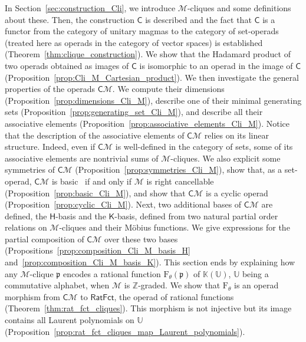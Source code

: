 \documentclass[10pt,reqno]{amsart}
\numberwithin{equation}{subsection}
\newcommand{\Z}{\mathbb{Z}}
\newcommand{\K}{\mathbb{K}}
\newcommand{\Mca}{\mathcal{M}}
\newcommand{\Hsf}{\mathsf{H}}
\newcommand{\Ksf}{\mathsf{K}}
\newcommand{\Ubb}{\mathbb{U}}
\newcommand{\Pfr}{\mathfrak{p}}
\newcommand{\Cli}{\mathsf{C}}
\newcommand{\RatFct}{\mathsf{RatFct}}
\newcommand{\Frac}{\mathrm{F}}
\begin{document}
In Section~\ref{sec:construction_Cli}, we introduce $\Mca$-cliques and
some definitions about these. Then, the construction $\Cli$ is
described and the fact that $\Cli$ is a functor from the category of
unitary magmas to the category of set-operads (treated here as operads
in the category of vector spaces) is established
(Theorem~\ref{thm:clique_construction}). We show that the Hadamard
product of two operads obtained as images of $\Cli$ is isomorphic to an
operad in the image of $\Cli$
(Proposition~\ref{prop:Cli_M_Cartesian_product}). We then investigate
the general properties of the operads $\Cli\Mca$. We compute their
dimensions (Proposition~\ref{prop:dimensions_Cli_M}), describe one of
their minimal generating sets
(Proposition~\ref{prop:generating_set_Cli_M}), and describe all their
associative elements (Proposition~\ref{prop:associative_elements_Cli_M}).
Notice that the description of the associative elements of $\Cli\Mca$
relies on its linear structure. Indeed, even if $\Cli\Mca$ is
well-defined in the category of sets, some of its associative elements
are nontrivial sums of $\Mca$-cliques. We also explicit some symmetries
of $\Cli\Mca$ (Proposition~\ref{prop:symmetries_Cli_M}), show that, as a
set-operad, $\Cli\Mca$ is basic~\cite{Val07} if and only if $\Mca$ is
right cancellable (Proposition~\ref{prop:basic_Cli_M}), and show that
$\Cli\Mca$ is a cyclic operad~\cite{GK95}
(Proposition~\ref{prop:cyclic_Cli_M}). Next, two additional bases of
$\Cli\Mca$ are defined, the $\Hsf$-basis and the $\Ksf$-basis, defined
from two natural partial order relations on $\Mca$-cliques and their
Möbius functions. We give expressions for the partial composition of
$\Cli\Mca$ over these two bases
(Propositions~\ref{prop:composition_Cli_M_basis_H}
and~\ref{prop:composition_Cli_M_basis_K}). This section ends by
explaining how any $\Mca$-clique $\Pfr$ encodes a rational function
$\Frac_\theta(\Pfr)$ of $\K(\Ubb)$, $\Ubb$ being a commutative alphabet,
when $\Mca$ is $\Z$-graded. We show that $\Frac_\theta$ is an operad
morphism from $\Cli\Mca$ to $\RatFct$, the operad of rational
functions~\cite{Lod10} (Theorem~\ref{thm:rat_fct_cliques}). This
morphism is not injective but its image contains all Laurent polynomials
on $\Ubb$
(Proposition~\ref{prop:rat_fct_cliques_map_Laurent_polynomials}).
\smallskip
\end{document}
